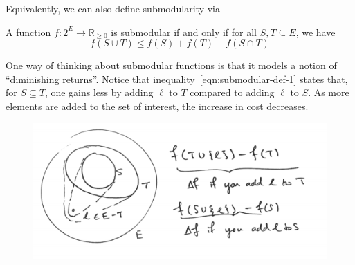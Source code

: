 \documentclass{article}
\begin{document}
Equivalently, we can also define submodularity via

\begin{definition}
A function $f: 2^E \rightarrow \mathbb{R}_{\geq 0}$ is submodular if and only if for all $S, T \subseteq E$, we have
\begin{equation}\label{eqn:submodular-def-2}
f(S \cup T) \leq f(S) + f(T) - f(S \cap T)
\end{equation}
\end{definition}

One way of thinking about submodular functions is that it models a notion of ``diminishing returns''. Notice that inequality~\ref{eqn:submodular-def-1} states that, for $S \subseteq T$, one gains less by adding $\ell$ to $T$ compared to adding $\ell$ to $S$. As more elements are added to the set of interest, the increase in cost decreases.

\begin{figure}[h!]
  \centering
  \includegraphics[scale=0.3192]{images/image-1.png}
\end{figure}

%
\end{document}
